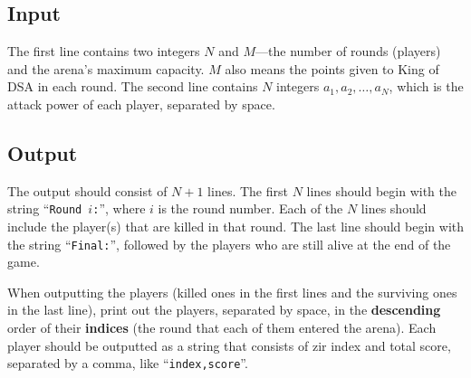 \subsection{Input}\label{input}

The first line contains two integers $N$ and $M$---the number of rounds (players) and the arena's maximum capacity. $M$ also means the points given to King of DSA in each round.
The second line contains $N$ integers $a_1, a_2, \dots, a_N$,  which is the attack power of each player, separated by space.

\subsection{Output}\label{output}

The output should consist of $N+1$ lines. The first $N$ lines should begin with the string ``\texttt{Round $i$:}'', where $i$ is the round number. Each of the $N$ lines should include the player(s) that are killed in that round. The last line should begin with the string ``\texttt{Final:}'', followed by the players who are still alive at the end of the game. 


When outputting the players (killed ones in the first lines and the surviving ones in the last line), print out the players, separated by space, in the \textbf{descending} order of their \textbf{indices} (the round that each of them entered the arena). Each player should be outputted as a string that consists of zir index and total score, separated by a comma, like ``\texttt{index,score}''. 


